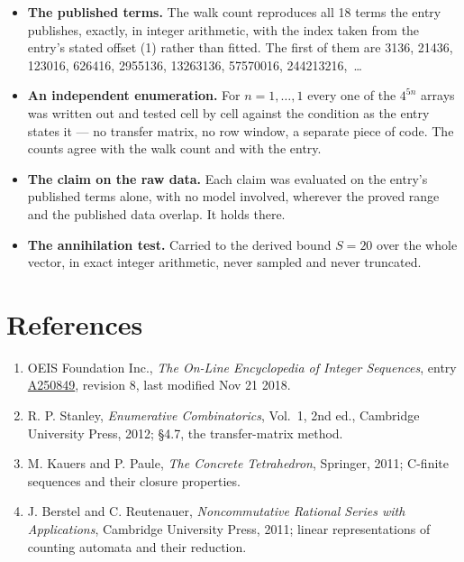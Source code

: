 \documentclass[11pt]{article}
\theoremstyle{definition}
\begin{document}
\begin{itemize}

\item {\bfseries The published terms.} The walk count reproduces all 18 terms the entry publishes, exactly, in integer arithmetic, with the index taken from the entry's stated offset (1) rather than fitted. The first of them are 3136, 21436, 123016, 626416, 2955136, 13263136, 57570016, 244213216,~\dots

\item {\bfseries An independent enumeration.} For $n = 1,\dots,1$ every one of the $4^{5n}$ arrays was written out and tested cell by cell against the condition as the entry states it --- no transfer matrix, no row window, a separate piece of code. The counts agree with the walk count and with the entry.

\item {\bfseries The claim on the raw data.} Each claim was evaluated on the entry's published terms alone, with no model involved, wherever the proved range and the published data overlap. It holds there.

\item {\bfseries The annihilation test.} Carried to the derived bound $S = 20$ over the whole vector, in exact integer arithmetic, never sampled and never truncated.

\end{itemize}

\section{References}

\begin{enumerate}

\item OEIS Foundation Inc., \emph{The On-Line Encyclopedia of Integer Sequences}, entry \href{https://oeis.org/A250849}{A250849}, revision 8, last modified Nov 21 2018.

\item R. P. Stanley, \emph{Enumerative Combinatorics}, Vol.~1, 2nd ed., Cambridge University Press, 2012; \S4.7, the transfer-matrix method.

\item M. Kauers and P. Paule, \emph{The Concrete Tetrahedron}, Springer, 2011; C-finite sequences and their closure properties.

\item J. Berstel and C. Reutenauer, \emph{Noncommutative Rational Series with Applications}, Cambridge University Press, 2011; linear representations of counting automata and their reduction.

\end{enumerate}
\end{document}
